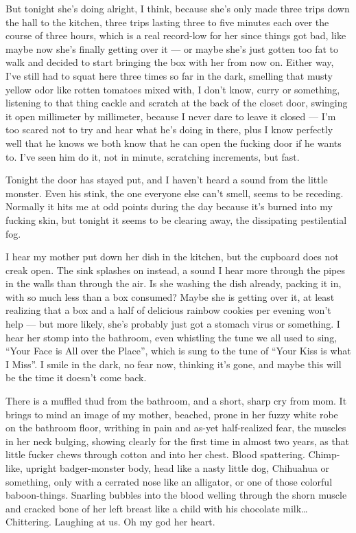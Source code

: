 But tonight she's doing alright, I think, because she's
only made three trips down the hall to the kitchen, three trips
lasting three to five minutes each over the course of three hours,
which is a real record-low for her since things got bad, like maybe
now she's finally getting over it --- or maybe
she's just gotten too fat to walk and decided to start
bringing the box with her from now on. Either way, I've still
had to squat here three times so far in the dark, smelling that
musty yellow odor like rotten tomatoes mixed with, I don't
know, curry or something, listening to that thing cackle and
scratch at the back of the closet door, swinging it open millimeter
by millimeter, because I never dare to leave it closed ---
I'm too scared not to try and hear what he's doing in
there, plus I know perfectly well that he knows we both know that
he can open the fucking door if he wants to. I've seen him do
it, not in minute, scratching increments, but fast.

Tonight the door has stayed put, and I haven't heard a sound
from the little monster. Even his stink, the one everyone else
can't smell, seems to be receding. Normally it hits me at odd
points during the day because it's burned into my fucking
skin, but tonight it seems to be clearing away, the dissipating
pestilential fog.

I hear my mother put down her dish in the kitchen, but the cupboard
does not creak open. The sink splashes on instead, a sound I hear
more through the pipes in the walls than through the air. Is she
washing the dish already, packing it in, with so much less than a
box consumed? Maybe she is getting over it, at least realizing that
a box and a half of delicious rainbow cookies per evening
won't help --- but more likely, she's probably just
got a stomach virus or something. I hear her stomp into the
bathroom, even whistling the tune we all used to sing, ``Your
Face is All over the Place'', which is sung to the tune of
``Your Kiss is what I Miss''. I smile in the dark, no
fear now, thinking it's gone, and maybe this will be the time
it doesn't come back.

There is a muffled thud from the bathroom, and a short, sharp cry
from mom. It brings to mind an image of my mother, beached, prone
in her fuzzy white robe on the bathroom floor, writhing in pain and
as-yet half-realized fear, the muscles in her neck bulging, showing
clearly for the first time in almost two years, as that little
fucker chews through cotton and into her chest. Blood spattering.
Chimp-like, upright badger-monster body, head like a nasty little
dog, Chihuahua or something, only with a cerrated nose like an
alligator, or one of those colorful baboon-things. Snarling bubbles
into the blood welling through the shorn muscle and cracked bone of
her left breast like a child with his chocolate milk{\ldots} Chittering.
Laughing at us. Oh my god her heart.

